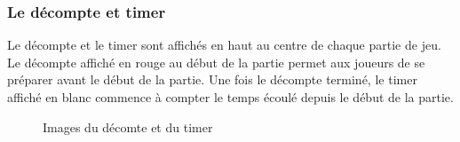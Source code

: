 \subsubsection*{Le décompte et timer}

Le décompte et le timer sont affichés en haut au centre de chaque partie de jeu. Le décompte affiché en rouge au début de la partie permet aux joueurs de se préparer avant le début de la partie. Une fois le décompte terminé, le timer affiché en blanc commence à compter le temps écoulé depuis le début de la partie.

\begin{figure}[!htb]%
    \centering
    \qquad
    \caption{Images du décomte et du timer}%
\end{figure}

